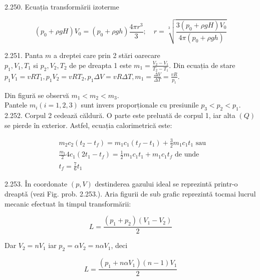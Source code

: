 \documentclass[10pt]{article}
\begin{document}
2.250. Ecuația transformării izoterme

$$
\left(p_{0}+\rho g H\right) V_{0}=\left(p_{0}+\rho g h\right) \frac{4 \pi r^{3}}{3} ; \quad r=\sqrt[3]{\frac{3\left(p_{0}+\rho g H\right) V_{0}}{4 \pi\left(p_{0}+\rho g h\right)}}
$$

2.251. Panta $m$ a dreptei care prin 2 stări oarecare\\
$p_{1}, V_{1}, T_{1}$ si $p_{2}, V_{2}, T_{2}$ de pe dreapta 1 este $m_{1}=\frac{V_{2}-V_{1}}{T_{2}-T_{1}}$. Din ecuația de stare $p_{1} V_{1}=v R T_{1}, p_{1} V_{2}=v R T_{2}, p_{1} \Delta V=v R \Delta T, m_{1}=\frac{\Delta V}{\Delta T}=\frac{v R}{p_{1}}$.

Din figură se observă $m_{1}<m_{2}<m_{3}$.\\
Pantele $m_{i}(i=1,2,3)$ sunt invers proporționale cu presiunile $p_{3}<p_{2}<p_{1}$.\\
2.252. Corpul 2 cedează căldură. O parte este preluată de corpul 1, iar alta $(Q)$ se pierde în exterior. Astfel, ecuația calorimetrică este:

$$
\begin{aligned}
& m_{2} c_{2}\left(t_{2}-t_{f}\right)=m_{1} c_{1}\left(t_{f}-t_{1}\right)+\frac{3}{2} m_{1} c_{1} t_{1} \text { sau } \\
& \frac{m_{1}}{2} 4 c_{1}\left(2 t_{1}-t_{f}\right)=\frac{1}{2} m_{1} c_{1} t_{1}+m_{1} c_{1} t_{f} \text { de unde } \\
& t_{f}=\frac{7}{6} t_{1}
\end{aligned}
$$

2.253. În coordonate $(p, V)$ destinderea gazului ideal se reprezintă printr-o dreaptǎ (vezi Fig. prob. 2.253.). Aria figurii de sub grafic reprezintă tocmai lucrul mecanic efectuat în timpul transformării:

$$
L=\frac{\left(p_{1}+p_{2}\right)\left(V_{1}-V_{2}\right)}{2}
$$

Dar $V_{2}=n V_{1}$ iar $p_{2}=\alpha V_{2}=n \alpha V_{1}$, deci

$$
L=\frac{\left(p_{1}+n \alpha V_{1}\right)(n-1) V_{1}}{2}
$$
\end{document}
